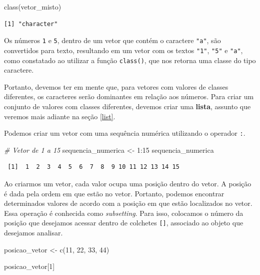 \documentclass[
  brazilian,
]{book}
\newenvironment{Shaded}{\begin{snugshade}}{\end{snugshade}}
\newcommand{\CommentTok}[1]{\textcolor[rgb]{0.56,0.35,0.01}{\textit{#1}}}
\newcommand{\DecValTok}[1]{\textcolor[rgb]{0.00,0.00,0.81}{#1}}
\newcommand{\FunctionTok}[1]{\textcolor[rgb]{0.00,0.00,0.00}{#1}}
\newcommand{\NormalTok}[1]{#1}
\newcommand{\OtherTok}[1]{\textcolor[rgb]{0.56,0.35,0.01}{#1}}
\newcommand{\SpecialCharTok}[1]{\textcolor[rgb]{0.00,0.00,0.00}{#1}}
\begin{document}
\begin{Shaded}
\begin{Highlighting}[]
\FunctionTok{class}\NormalTok{(vetor\_misto)}
\end{Highlighting}
\end{Shaded}

\begin{verbatim}
[1] "character"
\end{verbatim}

Os números \texttt{1} e \texttt{5}, dentro de um vetor que contém o caractere \texttt{"a"}, são convertidos para texto, resultando em um vetor com os textos \texttt{"1"}, \texttt{"5"} e \texttt{"a"}, como constatado ao utilizar a função \texttt{class()}, que nos retorna uma classe do tipo caractere.

Portanto, devemos ter em mente que, para vetores com valores de classes diferentes, os caracteres serão dominantes em relação aos números. Para criar um conjunto de valores com classes diferentes, devemos criar uma \textbf{lista}, assunto que veremos mais adiante na seção \ref{list}.

Podemos criar um vetor com uma sequência numérica utilizando o operador \texttt{:}.

\begin{Shaded}
\begin{Highlighting}[]
\CommentTok{\# Vetor de 1 a 15}
\NormalTok{sequencia\_numerica }\OtherTok{\textless{}{-}} \DecValTok{1}\SpecialCharTok{:}\DecValTok{15}
\NormalTok{sequencia\_numerica}
\end{Highlighting}
\end{Shaded}

\begin{verbatim}
 [1]  1  2  3  4  5  6  7  8  9 10 11 12 13 14 15
\end{verbatim}

Ao criarmos um vetor, cada valor ocupa uma posição dentro do vetor. A posição é dada pela ordem em que estão no vetor. Portanto, podemos encontrar determinados valores de acordo com a posição em que estão localizados no vetor. Essa operação é conhecida como \emph{subsetting}. Para isso, colocamos o número da posição que desejamos acessar dentro de colchetes \texttt{{[}{]}}, associado ao objeto que desejamos analisar.

\begin{Shaded}
\begin{Highlighting}[]
\NormalTok{posicao\_vetor }\OtherTok{\textless{}{-}} \FunctionTok{c}\NormalTok{(}\DecValTok{11}\NormalTok{, }\DecValTok{22}\NormalTok{, }\DecValTok{33}\NormalTok{, }\DecValTok{44}\NormalTok{)}

\NormalTok{posicao\_vetor[}\DecValTok{1}\NormalTok{]}
\end{Highlighting}
\end{Shaded}
\end{document}
